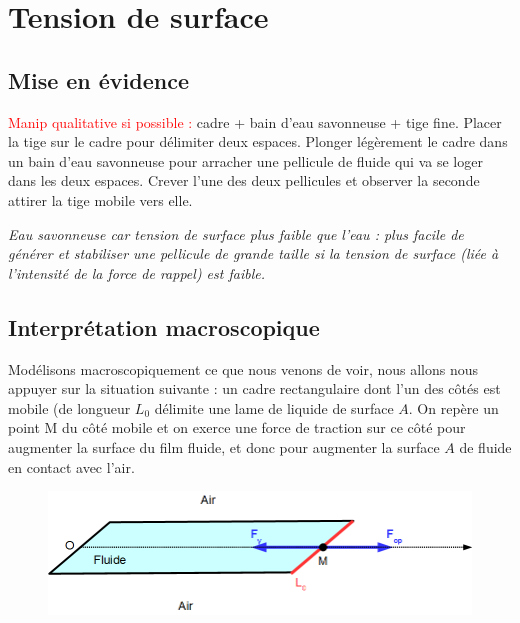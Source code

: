 \documentclass[11pt,a4paper]{report}
\begin{document}
\section{Tension de surface}

\subsection{Mise en évidence}

\textcolor{red}{Manip qualitative si possible :} cadre + bain d'eau savonneuse + tige fine. Placer la tige sur le cadre pour délimiter deux espaces. Plonger légèrement le cadre dans un bain d'eau savonneuse pour arracher une pellicule de fluide qui va se loger dans les deux espaces. Crever l'une des deux pellicules et observer la seconde attirer la tige mobile vers elle. 

\textit{Eau savonneuse car tension de surface plus faible que l'eau : plus facile de générer et stabiliser une pellicule de grande taille si la tension de surface (liée à l'intensité de la force de rappel) est faible.}

\subsection{Interprétation macroscopique}

Modélisons macroscopiquement ce que nous venons de voir, nous allons nous appuyer sur la situation suivante : un cadre rectangulaire dont l'un des côtés est mobile (de longueur $L_0$ délimite une lame de liquide de surface $A$. On repère un point M du côté mobile et on exerce une force de traction sur ce côté pour augmenter la surface du film fluide, et donc pour augmenter la surface $A$ de fluide en contact avec l'air.\\

\begin{figure}[h!]
\begin{center}
	\includegraphics[scale = 0.5]{force_superficielle.png} 
	\label{fig:force_superficielle}
\end{center}
\end{figure}
\end{document}
